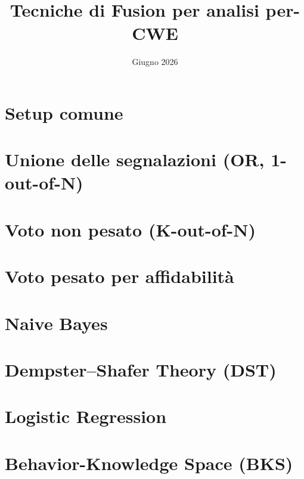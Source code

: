 \documentclass{article}
\title{\textbf{Tecniche di Fusion per analisi per-CWE}}
\date{Giugno 2026}
\begin{document}
\maketitle

\section{Setup comune}
\label{sec:setup}


\section{Unione delle segnalazioni (OR, 1-out-of-N)}
\label{sec:or}


\section{Voto non pesato (K-out-of-N)}
\label{sec:majority}


\section{Voto pesato per affidabilit\`a}
\label{sec:wv}


\section{Naive Bayes}
\label{sec:naive}


\section{Dempster--Shafer Theory (DST)}
\label{sec:dst}


\section{Logistic Regression}
\label{sec:logistic_regression}


\section{Behavior-Knowledge Space (BKS)}
\label{sec:bks}

\end{document}
